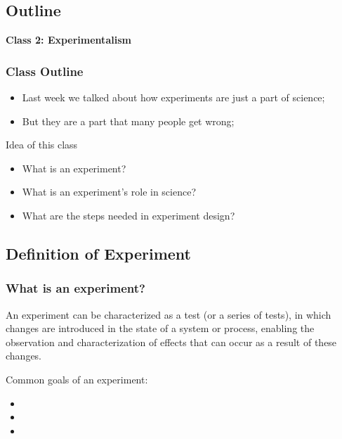 \documentclass{beamer}
\begin{document}
\subsection{Outline}
\begin{frame}
  \begin{center}
    {\bf Class 2: Experimentalism}
  \end{center}
\end{frame}

\begin{frame}
  \frametitle{Class Outline}
  \begin{itemize}
    \item Last week we talked about how experiments are just a part of science;
    \item But they are a part that many people get wrong;      
  \end{itemize}

  \begin{block}{Idea of this class}
    \begin{itemize}
    \item What is an experiment?
    \item What is an experiment's role in science?
    \item What are the steps needed in experiment design?
    \end{itemize}
  \end{block}    
\end{frame}

\subsection{Definition of Experiment}

\begin{frame}
  \frametitle{What is an experiment?}
  \begin{block}{}
    \begin{center}
      {\small
    An experiment can be characterized as a test (or a series of
    tests), in which changes are introduced in the state of a system
    or process, enabling the observation and characterization of
    effects that can occur as a result of these changes.}
    \end{center}
  \end{block}

  \bigskip

  Common goals of an experiment:
  \begin{itemize}
    \item {}
    \item {}
    \item {}
  \end{itemize}
\end{frame}
\end{document}
